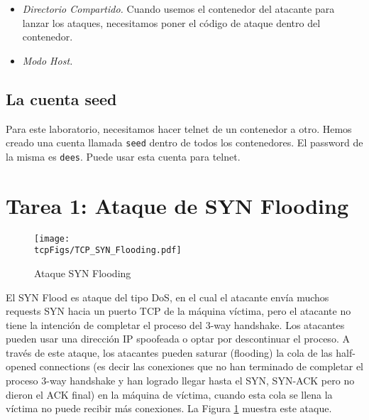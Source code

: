 \begin{itemize}
\item \textit{Directorio Compartido.} Cuando usemos el contenedor del atacante para lanzar los ataques, necesitamos poner el código de ataque dentro del contenedor.



\item \textit{Modo Host.}

\end{itemize}


%


\subsection{La cuenta seed} 

Para este laboratorio, necesitamos hacer telnet de un contenedor a otro.
Hemos creado una cuenta llamada \texttt{seed} dentro de todos los contenedores.
El password de la misma es \texttt{dees}. Puede usar esta cuenta para telnet.



\section{Tarea 1: Ataque de SYN Flooding}


\begin{figure}[htb]
  \begin{center}
    \texttt{[image: \\tcpFigs/TCP\_SYN\_Flooding.pdf]}
  \end{center}
  \caption{Ataque SYN Flooding}
  \label{tcp:fig:synflooding}
\end{figure}
 

El SYN Flood es ataque del tipo DoS, en el cual el atacante envía muchos requests SYN hacia un puerto TCP de la máquina víctima, pero el atacante no tiene la intención de completar el proceso del 3-way handshake. Los atacantes pueden usar una dirección IP spoofeada o optar por descontinuar el proceso.
A través de este ataque, los atacantes pueden saturar (flooding) la cola de las half-opened connections (es decir las conexiones que no han terminado de completar el proceso 3-way handshake y han logrado llegar hasta el SYN, SYN-ACK pero no dieron el ACK final) en la máquina de víctima, cuando esta cola se llena la víctima no puede recibir más conexiones. La Figura \ref{tcp:fig:synflooding} muestra este ataque.

